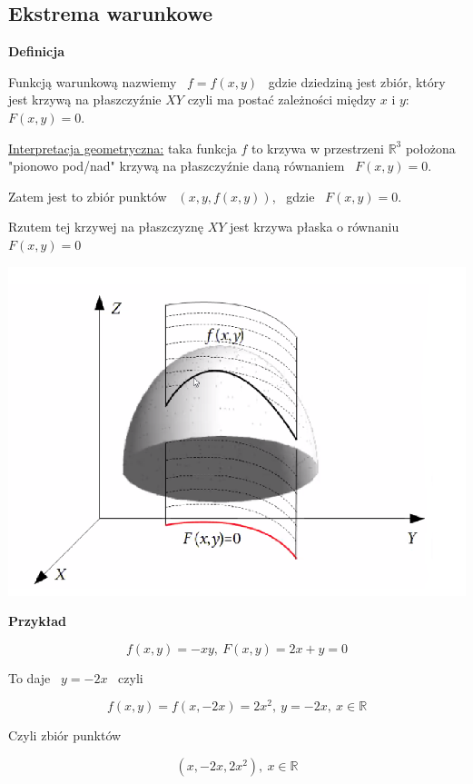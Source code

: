 \subsection*{Ekstrema warunkowe}

\textbf{Definicja}

Funkcją warunkową nazwiemy \ $ f = f(x,y) $ \ gdzie dziedziną jest zbiór, który jest krzywą na płaszczyźnie $XY$ czyli ma postać zależności
między $x$ i $y$: \ $F(x,y) = 0$.

\underline{Interpretacja geometryczna:} taka funkcja $f$ to krzywa w przestrzeni $ \mathbb{R}^3 $ położona "pionowo pod/nad" krzywą na płaszczyźnie
daną równaniem \ $F(x,y) = 0$.

Zatem jest to zbiór punktów \ $ (x, y, f(x,y)) $, \ gdzie \ $ F(x,y) = 0 $.

Rzutem tej krzywej na płaszczyznę $XY$ jest krzywa płaska o równaniu $F(x,y) = 0$

\begin{center}
\includegraphics[scale=0.4]{img/rzut_plaszczyznaXY.png}
\end{center}

\textbf{Przykład}

\[ f(x,y) = -xy, \ F(x,y) = 2x + y = 0 \]

\begin{center}To daje \ $ y = -2x $ \ czyli\end{center} 
\[ f(x,y) = f(x, -2x) = 2x^2, \ y=-2x, \ x\in \mathbb{R} \]

\begin{center}Czyli zbiór punktów\end{center}
\[ (x, -2x, 2x^2), \ x \in \mathbb{R} \]

